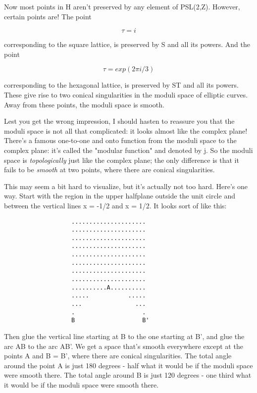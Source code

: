 Now most points in H aren't preserved by any element of PSL(2,Z).  
However, certain points are!  The point 

$$
                            \tau  = i
$$
    
corresponding to the square lattice, is preserved by S and all its
powers.  And the point

$$
                         \tau  = exp(2\pi i/3)
$$
    
corresponding to the hexagonal lattice, is preserved by ST and all its
powers.   These give rise to two conical singularities in the moduli
space of elliptic curves.  Away from these points, the moduli space is
smooth.  

Lest you get the wrong impression, I should hasten to reassure you that
the moduli space is not all that complicated: it looks almost like the
complex plane!  There's a famous one-to-one and onto function from the
moduli space to the complex plane: it's called the "modular function"
and denoted by j.  So the moduli space is \emph{topologically} just like the 
complex plane; the only difference is that it fails to be \emph{smooth} at
two points, where there are conical singularities.  

This may seem a bit hard to visualize, but it's actually not too hard.   
Here's one way.  Start with the region in the upper halfplane outside 
the unit circle and between the vertical lines x = -1/2 and x = 1/2.  
It looks sort of like this:

\begin{verbatim}
                   .....................
                   .....................
                   .....................
                   .....................
                   .....................   
                   .....................
                   .....................               
                   .....................         
                   ..........A..........
                   .....           .....
                   ...               ...
                   .                   .
                   B                   B'

\end{verbatim}
    
Then glue the vertical line starting at B to the one starting at B',
and glue the arc AB to the arc AB'.  We get a space that's smooth
everywhere except at the points A and B = B', where there are conical
singularities.  The total angle around the point A is just 180 degrees
- half what it would be if the moduli space were smooth there.  The
total angle around B is just 120 degrees - one third what it would be
if the moduli space were smooth there.

